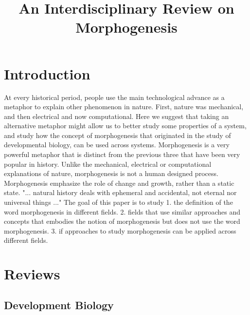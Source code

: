 \documentclass{article}
\begin{document}
\title{An Interdisciplinary Review on Morphogenesis}
\date{}

\maketitle

\section{Introduction}

At every historical period, people use the main technological advance as a metaphor to explain other phenomenon in nature. First, nature was mechanical, and then electrical and now computational. Here we suggest that taking an alternative metaphor might allow us to better study some properties of a system, and study how the concept of morphogenesis that originated in the study of developmental biology, can be used across systems. Morphogenesis is a very powerful metaphor that is distinct from the previous three that have been very popular in history. Unlike the mechanical, electrical or computational explanations of nature, morphogenesis is not a human designed process. Morphogenesis emphasize the role of change and growth, rather than a static state. "... natural history deals with ephemeral and accidental, not eternal nor universal things ..." \cite{thompson1942growth} The goal of this paper is to study 1. the definition of the word morphogenesis in different fields. 2. fields that use similar approaches and concepts that embodies the notion of morphogenesis but does not use the word morphogenesis. 3. if approaches to study morphogenesis can be applied across different fields. 



\section{Reviews}


\subsection{Development Biology}

\end{document}
